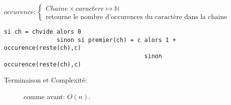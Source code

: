 \documentclass[10pt]{article}\usepackage[correction,nu]{esial}
\begin{document}
\begin{Question}
  $occurence: \left\{
    \begin{array}{l}
      Chaine\times caract\grave{e}re\mapsto \mathbb{N}\\
      \text{retourne le nombre d'occurences du caractère dans la chaine}
    \end{array}\right.$  
\end{Question}
\begin{Reponse}
  \begin{Verbatim}[label=occurences(ch\quotesinglbase c)]
si ch = chvide alors 0
               sinon si premier(ch) = c alors 1 + occurence(reste(ch),c)
                                        sinon     occurence(reste(ch),c)    
  \end{Verbatim}
  \begin{description}
  \item[Terminaison et Complexité:] comme avant: $O(n)$. 
  \end{description}
\end{Reponse}
\end{document}
